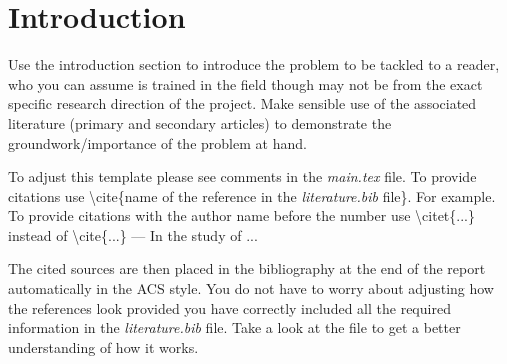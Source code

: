 \section{Introduction}
Use the introduction section to introduce the problem to be tackled to a reader, who you can assume is trained in the field though may not be from the exact specific research direction of the project. Make sensible use of the associated literature (primary and secondary articles) to demonstrate the groundwork/importance of the problem at hand.

To adjust this template please see comments in the \textit{main.tex} file. To provide citations use \textbackslash cite\{name of the reference in the \textit{literature.bib} file\}. For example\cite{vogelpaper}. To provide citations with the author name before the number use \textbackslash citet\{...\} instead of \textbackslash cite\{...\} --- In the study of \citet{boccaccinipaper}...

The cited sources are then placed in the bibliography at the end of the report automatically in the ACS style. You do not have to worry about adjusting how the references look provided you have correctly included all the required information in the \textit{literature.bib} file. Take a look at the file to get a better understanding of how it works.
